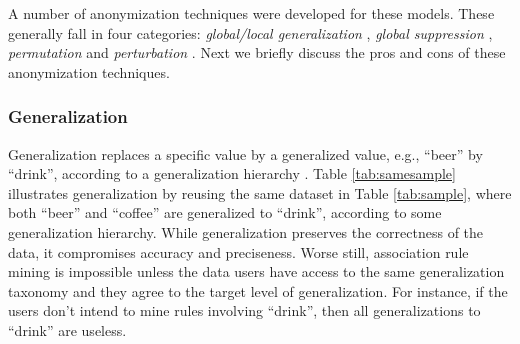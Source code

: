 A number of anonymization techniques
were developed for these models. 
These generally fall in four categories: {\em
global/local generalization} 
\cite{Terrovitis:2008:PAS,He:2009:ASD,Cao:2010:rho}, {\em global suppression} \cite{Xu:2008:ATD,Cao:2010:rho},
{\em permutation} \cite{2011:TKDE:Anonymous} and {\em perturbation}
\cite{Zhang:2007:agg,ChenMFDX11:Diff}. Next we briefly discuss the pros and
cons of these anonymization techniques.

\subsubsection{Generalization}

Generalization replaces a specific value by
a generalized value, e.g., ``beer'' by ``drink'',
according to a generalization hierarchy \cite{FungWCY10:Survey}.
Table \ref{tab:samesample} illustrates generalization by reusing the
same dataset in Table \ref{tab:sample}, where both ``beer'' and ``coffee''
are generalized to ``drink'', according to some generalization hierarchy.
While generalization preserves the correctness of the data,
it compromises accuracy
and preciseness. Worse still, association rule mining is impossible
unless the data users have access to the same generalization taxonomy
and they agree to the target level of generalization. For instance, if
the users don't intend to mine rules involving ``drink'', then
all generalizations to ``drink'' are useless.

